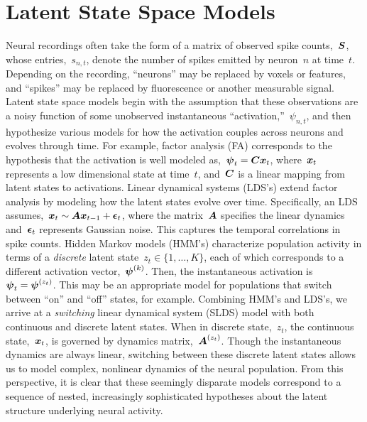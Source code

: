 \section{Latent State Space Models}
Neural recordings often take the form of a matrix of observed
spike counts,~$\boldsymbol{S}$, whose entries,~$s_{n,t}$, denote the number of spikes 
emitted by  neuron~$n$ at time~$t$. Depending on the recording, ``neurons''
may be replaced by voxels or features, and ``spikes'' may be replaced by fluorescence or 
another measurable signal. Latent state space models begin with the assumption 
that these observations are a noisy function of some unobserved instantaneous 
``activation,''~$\psi_{n,t}$, and then hypothesize various models
for how the activation couples across neurons and evolves through time.
For example, factor analysis (FA) corresponds to the hypothesis that the activation is well
modeled as,~$\boldsymbol{\psi}_{t} = \boldsymbol{C} \boldsymbol{x}_t$,
where~$\boldsymbol{x}_t$ represents a low dimensional state at time~$t$, and~$\boldsymbol{C}$ is a 
linear mapping from latent states to activations. 
Linear dynamical systems (LDS's) extend factor analysis by modeling how the latent 
states evolve over time. Specifically, an LDS assumes,~$\boldsymbol{x}_t \sim \boldsymbol{A} \boldsymbol{x}_{t-1} + \boldsymbol{\epsilon}_t$, where 
the matrix~$\boldsymbol{A}$ specifies the linear dynamics and~$\boldsymbol{\epsilon}_t$ represents Gaussian noise. 
This captures the temporal correlations in spike counts.
Hidden Markov models (HMM's) characterize population activity in terms of a \emph{discrete}
latent state~${z_t \in \{1, \ldots, K\}}$, each of which corresponds to a different 
activation vector,~$\boldsymbol{\psi}^{(k)}$. Then, the instantaneous activation is~$\boldsymbol{\psi}_{t}=\boldsymbol{\psi}^{(z_t)}$.
This may be an appropriate model for populations that switch between ``on'' and ``off'' states, 
for example. 
Combining HMM's and LDS's, we arrive at a \emph{switching} linear dynamical system (SLDS) model 
with both continuous and discrete latent states. When in discrete state,~$z_t$, 
the continuous state,~$\boldsymbol{x}_t$, is governed by dynamics matrix,~$\boldsymbol{A}^{(z_t)}$. 
Though the instantaneous dynamics are always linear, switching between these 
discrete latent states allows us to model complex, nonlinear dynamics of the neural population.
From this perspective, it is clear that these seemingly disparate models
correspond to a sequence of nested, increasingly sophisticated hypotheses about
the latent structure underlying neural activity.

